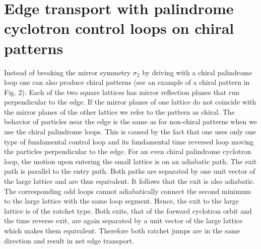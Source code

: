 \documentclass[12pt]{iopart}
\begin{document}
\section{Edge transport with palindrome cyclotron control loops on chiral patterns}

Instead of breaking the mirror symmetry $\sigma_2$ by driving with a chiral palindrome loop one can
also produce chiral patterns (see an example of a chiral pattern in Fig. 2). Each of the two  square lattices has mirror reflection planes that
run perpendicular to the edge. If the mirror planes of one lattice
do not coincide with the mirror planes of the other lattice we refer to the pattern as chiral.
The behavior of particles near the edge
is the same as for non-chiral patterns when we use the chiral palindrome loops. This is caused by the fact
that one uses only one type of fundamental control loop and its fundamental time reversed loop moving the particles perpendicular to the edge.
For an even chiral palindrome cyclotron loop, the motion upon entering the small lattice is on an adiabatic path.
The exit path is parallel to the entry path. Both paths are separated by one unit vector of the large lattice
and are thus equivalent. It follows that the exit is also adiabatic. The corresponding odd loops cannot adiabatically
connect the second minimum to the large lattice with the same loop segment. Hence, the exit to the large lattice
is of the ratchet type. Both exits, that of the forward cyclotron orbit and the time reverse exit, are again separated
by a unit vector of the large lattice which makes them equivalent. Therefore both ratchet jumps are in the same direction
and result in net edge transport.
 
\end{document}
